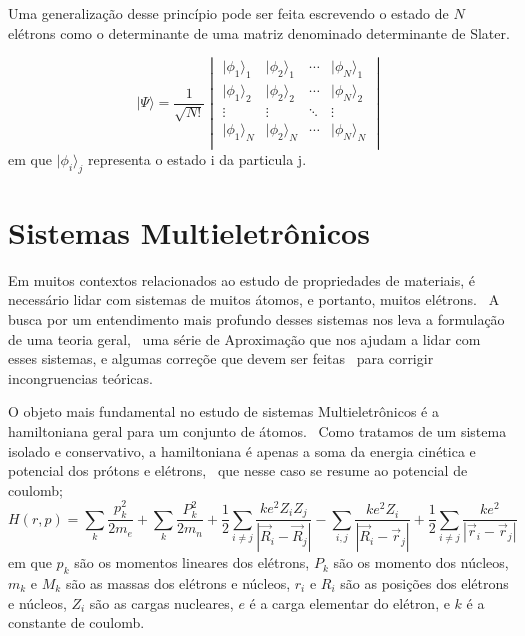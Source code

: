 Uma generalização desse princípio pode ser feita escrevendo o estado de $N$ elétrons como o determinante de uma matriz denominado determinante de Slater.

\begin{equation}
    \label{eq:slater_matrix_kets}
    |\Psi\rangle = \frac{1}{\sqrt{N!}}
    \begin{vmatrix}
        |\phi_1\rangle_1 & |\phi_2\rangle_1 & \cdots & |\phi_N\rangle_1 \\
        |\phi_1\rangle_2 & |\phi_2\rangle_2 & \cdots & |\phi_N\rangle_2 \\
        \vdots & \vdots & \ddots & \vdots \\
        |\phi_1\rangle_N & |\phi_2\rangle_N & \cdots & |\phi_N\rangle_N \\
    \end{vmatrix}
\end{equation}
em que $|\phi_i\rangle_j$ representa o estado i da particula j.

\section{Sistemas Multieletrônicos}

Em muitos contextos relacionados ao estudo de propriedades de materiais, é necessário lidar com sistemas de muitos átomos, e portanto, muitos elétrons. \
A busca por um entendimento mais profundo desses sistemas nos leva a formulação de uma teoria geral, \
uma série de Aproximação que nos ajudam a lidar com esses sistemas, e algumas correçõe que devem ser feitas \
para corrigir incongruencias teóricas.

O objeto mais fundamental no estudo de sistemas Multieletrônicos é a hamiltoniana geral para um conjunto de átomos. \
Como tratamos de um sistema isolado e conservativo, a hamiltoniana é apenas a soma da energia cinética e potencial dos prótons e elétrons, \
que nesse caso se resume ao potencial de coulomb;
\begin{equation}
    H(r,p) = \sum_k \frac{p^2_{k}}{2m_e} + \sum_k \frac{P^2_{k}}{2m_n} + \frac{1}{2} \sum_{i \neq j} \frac{k e^2 Z_i Z_j}{|\vec{R}_i-\vec{R}_j|} - \sum_{i,j} \frac{k e^2 Z_i}{|\vec{R}_i-\vec{r}_j|} + \frac{1}{2} \sum_{i\neq j} \frac{ke^2}{|\vec{r}_i - \vec{r}_j|}
\end{equation}
em que $p_k$ são os momentos lineares dos elétrons, $P_k$ são os momento dos núcleos, $m_k$ e $M_k$ são as massas dos elétrons e núcleos, $r_i$ e $R_i$ são as posições dos elétrons e núcleos, $Z_i$ são as cargas nucleares, $e$ é a carga elementar do elétron, e $k$ é a constante de coulomb.

